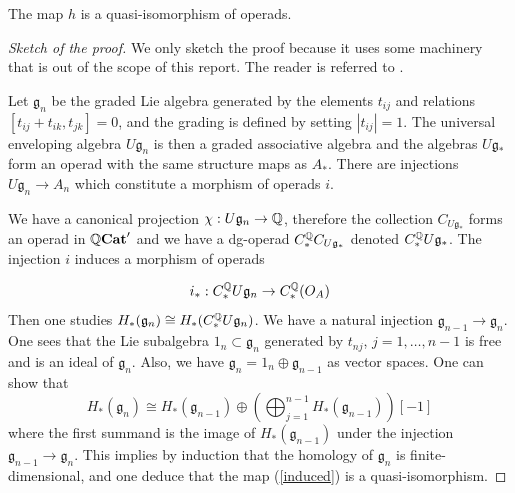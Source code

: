 \documentclass[TFM.tex]{subfiles}
\begin{document}
\begin{prop}\cite[Theorem 4.1]{Tamarkin}\label{4.1}
The map $h$ is a quasi-isomorphism of operads. 
\end{prop}
\begin{proof}[Sketch of the proof] We only sketch the proof because it uses some machinery that is out of the scope of this report. The reader is referred to \cite{Tamarkin}.

Let $\mathfrak{g}_n$ be the graded Lie algebra generated by the elements $t_{ij}$ and
relations $[t_{ij}+t_{ik},t_{jk}]=0$, and the grading is defined by setting $|t_{ij}|= 1$. The universal enveloping algebra $U\mathfrak{g}_n$ is then a graded associative algebra and the algebras $U\mathfrak{g}_*$ form an operad with the same structure maps as $A_*$. There are injections $U\mathfrak{g}_n\to A_n$ which constitute a morphism of operads $i$.

We have a canonical projection $\chi:U\mathfrak{g}_n\to\mathbb{Q}$, therefore the collection $C_{U\mathfrak{g}_*}$ forms an operad in $\mathbb{Q}\mathrm{\mathbf{Cat}}'$ and we have a dg-operad $C_*^{\mathbb{Q}} C_{U\mathfrak{g}_*}$ denoted $C_*^{\mathbb{Q}} U\mathfrak{g}_*$. The injection $i$ induces a morphism of operads 

\begin{equation}\label{induced}
i_*:C_*^{\mathbb{Q}} U\mathfrak{g}_n\to C_*^{\mathbb{Q}}(O_A)
\end{equation}
Then one studies $H_*(\mathfrak{g}_n)\cong H_*(C_*^{\mathbb{Q}} U\mathfrak{g}_n)$. We have a natural injection $\mathfrak{g}_{n-1}\to \mathfrak{g}_n$. One sees that the Lie subalgebra $\mathfrak{1}_n\subset \mathfrak{g}_n$ generated by $t_{nj}$, $j=1,\dots, n-1$ is free and is an ideal of $\mathfrak{g}_n$. Also, we have $\mathfrak{g}_n=\mathfrak{1}_n\oplus\mathfrak{g}_{n-1}$ as vector spaces. One can show that
\begin{equation}\label{homology}
H_*(\mathfrak{g}_n)\cong H_*(\mathfrak{g}_{n-1})\oplus \left(\bigoplus_{j=1}^{n-1}H_*(\mathfrak{g}_{n-1})\right)[-1]
\end{equation}
where the first summand is the image of $H_*(\mathfrak{g}_{n-1})$ under the injection $\mathfrak{g}_{n-1}\to \mathfrak{g}_n$. This implies by induction that the homology of $\mathfrak{g}_n$ is finite-dimensional, and one deduce that
the map (\ref{induced}) is a quasi-isomorphism. 


\end{proof}
\end{document}

